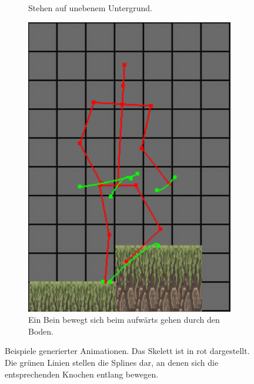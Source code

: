 \begin{figure}
\begin{subfigure}[t]{.4\linewidth}
        \caption{Stehen auf unebenem Untergrund.}
        \label{standing_uneven}
    \end{subfigure}
    \begin{subfigure}[t]{.4\linewidth}
        \centering
        \includegraphics[width=0.75\linewidth]{images/clip_through_gorund.png}
        \caption{Ein Bein bewegt sich beim aufwärts gehen durch den Boden.}
        \label{clip_through_ground}
    \end{subfigure}
    \caption{Beispiele generierter Animationen. Das Skelett ist in rot dargestellt. Die grünen Linien stellen die Splines dar, an denen sich die entsprechenden Knochen entlang bewegen.}
\end{figure}